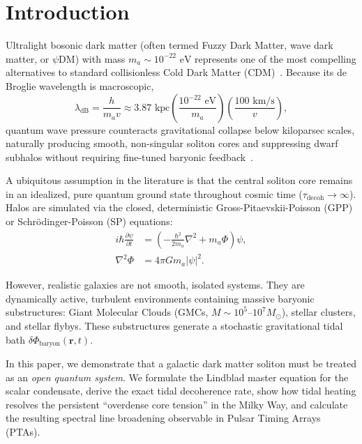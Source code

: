 \documentclass[aps,prd,twocolumn,superscriptaddress,nofootinbib,floatfix,longbibliography]{revtex4-2}
\begin{document}

\maketitle

\section{Introduction}
\label{sec:intro}

Ultralight bosonic dark matter (often termed Fuzzy Dark Matter, wave dark matter, or $\psi\text{DM}$) with mass $m_a \sim 10^{-22}\text{ eV}$ represents one of the most compelling alternatives to standard collisionless Cold Dark Matter (CDM)~\cite{Hu2000,Schive2014,Hui2017}. Because its de Broglie wavelength is macroscopic,
\begin{equation}
\lambda_{\text{dB}} = \frac{h}{m_a v} \approx 3.87\text{ kpc} \left(\frac{10^{-22}\text{ eV}}{m_a}\right) \left(\frac{100\text{ km/s}}{v}\right),
\end{equation}
quantum wave pressure counteracts gravitational collapse below kiloparsec scales, naturally producing smooth, non-singular soliton cores and suppressing dwarf subhalos without requiring fine-tuned baryonic feedback~\cite{Schive2014}.

A ubiquitous assumption in the literature is that the central soliton core remains in an idealized, pure quantum ground state throughout cosmic time ($\tau_{\text{decoh}} \to \infty$). Halos are simulated via the closed, deterministic Gross-Pitaevskii-Poisson (GPP) or Schr\"odinger-Poisson (SP) equations:
\begin{align}
i\hbar \frac{\partial \psi}{\partial t} &= \left( -\frac{\hbar^2}{2 m_a}\nabla^2 + m_a \Phi \right) \psi, \label{eq:sp1} \\
\nabla^2 \Phi &= 4\pi G m_a |\psi|^2. \label{eq:sp2}
\end{align}

However, realistic galaxies are not smooth, isolated systems. They are dynamically active, turbulent environments containing massive baryonic substructures: Giant Molecular Clouds (GMCs, $M \sim 10^5\text{--}10^7 M_\odot$), stellar clusters, and stellar flybys. These substructures generate a stochastic gravitational tidal bath $\delta\Phi_{\text{baryon}}(\mathbf{r}, t)$.

In this paper, we demonstrate that a galactic dark matter soliton must be treated as an \textit{open quantum system}. We formulate the Lindblad master equation for the scalar condensate, derive the exact tidal decoherence rate, show how tidal heating resolves the persistent ``overdense core tension'' in the Milky Way, and calculate the resulting spectral line broadening observable in Pulsar Timing Arrays (PTAs).
\end{document}
